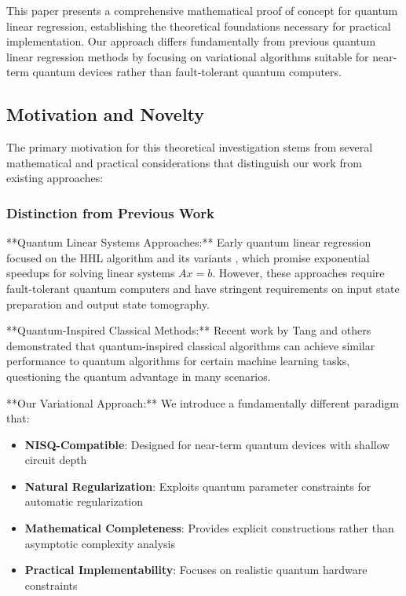 \documentclass[11pt]{article}
\begin{document}
This paper presents a comprehensive mathematical proof of concept for quantum linear regression, establishing the theoretical foundations necessary for practical implementation. Our approach differs fundamentally from previous quantum linear regression methods by focusing on variational algorithms suitable for near-term quantum devices rather than fault-tolerant quantum computers.

\subsection{Motivation and Novelty}

The primary motivation for this theoretical investigation stems from several mathematical and practical considerations that distinguish our work from existing approaches:

\subsubsection{Distinction from Previous Work}

**Quantum Linear Systems Approaches:** Early quantum linear regression focused on the HHL algorithm \cite{harrow2009quantum} and its variants \cite{wiebe2012quantum}, which promise exponential speedups for solving linear systems $Ax = b$. However, these approaches require fault-tolerant quantum computers and have stringent requirements on input state preparation and output state tomography.

**Quantum-Inspired Classical Methods:** Recent work by Tang and others \cite{tang2019quantum} demonstrated that quantum-inspired classical algorithms can achieve similar performance to quantum algorithms for certain machine learning tasks, questioning the quantum advantage in many scenarios.

**Our Variational Approach:** We introduce a fundamentally different paradigm that:
\begin{itemize}
\item \textbf{NISQ-Compatible}: Designed for near-term quantum devices with shallow circuit depth
\item \textbf{Natural Regularization}: Exploits quantum parameter constraints for automatic regularization
\item \textbf{Mathematical Completeness}: Provides explicit constructions rather than asymptotic complexity analysis
\item \textbf{Practical Implementability}: Focuses on realistic quantum hardware constraints
\end{itemize}
\end{document}

